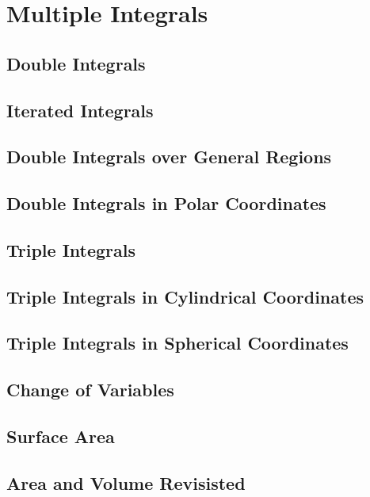 \documentclass[../satmath.tex]{subfiles}
\begin{document}
\chapter{Multiple Integrals}
\section{Double Integrals}
\section{Iterated Integrals}
\section{Double Integrals over General Regions}
\section{Double Integrals in Polar Coordinates}
\section{Triple Integrals}
\section{Triple Integrals in Cylindrical Coordinates}
\section{Triple Integrals in Spherical Coordinates}
\section{Change of Variables}
\section{Surface Area}
\section{Area and Volume Revisisted}
\end{document}
